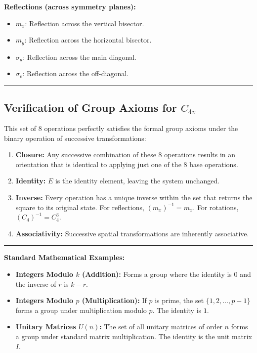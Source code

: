 \documentclass[11pt, a4paper]{report}
\begin{document}
\textbf{Reflections (across symmetry planes):}
\begin{itemize}
    \item $m_x$: Reflection across the vertical bisector.
    \item $m_y$: Reflection across the horizontal bisector.
    \item $\sigma_u$: Reflection across the main diagonal.
    \item $\sigma_v$: Reflection across the off-diagonal.
\end{itemize}

\vspace{1em}
\hrule
\vspace{1em}

\subsection*{Verification of Group Axioms for $C_{4v}$}
This set of 8 operations perfectly satisfies the formal group axioms under the binary operation of successive transformations:
\begin{enumerate}
    \item \textbf{Closure:} Any successive combination of these 8 operations results in an orientation that is identical to applying just one of the 8 base operations.
    \item \textbf{Identity:} $E$ is the identity element, leaving the system unchanged.
    \item \textbf{Inverse:} Every operation has a unique inverse within the set that returns the square to its original state. For reflections, $(m_x)^{-1} = m_x$. For rotations, $(C_4)^{-1} = C_4^3$.
    \item \textbf{Associativity:} Successive spatial transformations are inherently associative.
\end{enumerate}

\vspace{1em}
\hrule
\vspace{1em}

\textbf{Standard Mathematical Examples:}\\
\begin{itemize}
    \item \textbf{Integers Modulo $k$ (Addition):} Forms a group where the identity is $0$ and the inverse of $r$ is $k-r$.
    \item \textbf{Integers Modulo $p$ (Multiplication):} If $p$ is prime, the set $\{1, 2, \dots, p-1\}$ forms a group under multiplication modulo $p$. The identity is $1$.
    \item \textbf{Unitary Matrices $U(n)$:} The set of all unitary matrices of order $n$ forms a group under standard matrix multiplication. The identity is the unit matrix $I$.
\end{itemize}
\end{document}
